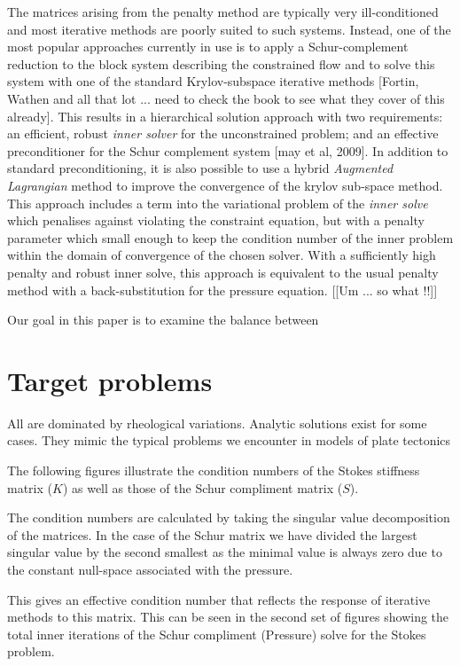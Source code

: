 \documentclass[]{svjour3}
\begin{document}
The matrices arising from the penalty method are typically very ill-conditioned and most iterative methods 
are poorly suited to such systems. Instead, one of the most popular approaches currently in use is to 
apply a Schur-complement reduction to the block system describing the constrained flow and to solve this
system with one of the standard Krylov-subspace iterative methods [Fortin, Wathen and all that lot ... need to
check the book to see what they cover of this already]. This
results in a hierarchical solution approach with two requirements: an efficient, robust \textit{inner solver} 
for the unconstrained problem; and an effective preconditioner for the Schur complement system [may et al, 2009].
In addition to standard preconditioning, it is also possible to use a hybrid \textit{Augmented Lagrangian} method
to improve the convergence of the krylov sub-space method. This approach includes a term into the 
variational problem of the \textit{inner solve} which penalises against violating the constraint equation, 
but with a penalty parameter which small enough to keep the condition number of the inner problem within the 
domain of convergence of the chosen solver. With a sufficiently high penalty and robust inner solve,
this approach is equivalent to the usual penalty method with a back-substitution for the pressure equation.
[[Um ... so what !!]]

Our goal in this paper is to examine the balance between 


\section{Target problems}

All are dominated by rheological variations. Analytic solutions exist for some cases.
They mimic the typical problems we encounter in models of plate tectonics

The following figures illustrate the condition numbers of the Stokes stiffness matrix ($K$) as well as 
those of the Schur compliment matrix ($S$).

The condition numbers are calculated by taking the singular value decomposition of the matrices.
In the case of the Schur matrix we have divided the largest singular value by the second smallest as the minimal value is always zero due to the constant null-space associated with the pressure.

This gives an effective condition number that reflects the response of iterative methods to this matrix.
This can be seen in the second set of figures showing the total inner iterations of the Schur compliment (Pressure) solve for the
Stokes problem.
\end{document}
